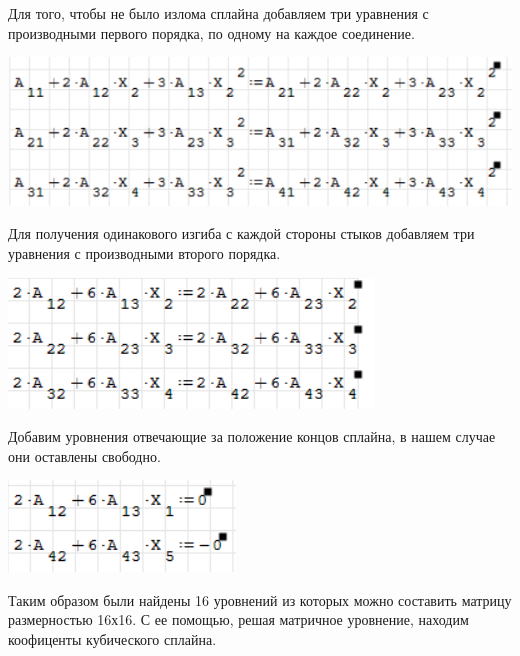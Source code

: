 \documentclass[russian,utf8,nocolumxxxi,nocolumnxxxii]{eskdtext}
\begin{document}
\par
\newpage
\normalsize
Для того, чтобы не было излома сплайна добавляем три уравнения с производными первого порядка, по одному на каждое соединение.
\begin{center}\includegraphics[scale=0.6]{13}\end{center}
\par
\normalsize
Для получения одинакового изгиба с каждой стороны стыков добавляем три уравнения с производными второго порядка.
\begin{center} \includegraphics[scale=0.6]{14}\end{center}
\par
\normalsize
Добавим уровнения отвечающие за положение концов сплайна, в нашем случае они оставлены свободно.
\begin{center}\includegraphics[scale=0.6]{15}\end{center}
\newpage
\par
\normalsize
Таким образом были найдены 16 уровнений из которых можно составить матрицу размерностью 16х16. С ее помощью, решая матричное уровнение, находим коофиценты кубического сплайна.
\end{document}

